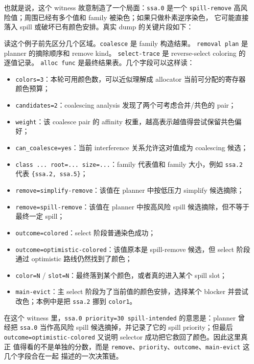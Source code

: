 \documentclass[UTF8,a4paper,11pt]{ctexart}
\begin{document}
也就是说，这个 witness 故意制造了一个局面：\texttt{ssa.0} 是一个
\texttt{spill-remove} 高风险值；周围已经有多个值和 family 被染色；如果只做朴素逆序染色，
它可能直接落入 spill 或破坏已有颜色安排。真实 dump 的关键片段如下：

读这个例子前先区分几个区域。\texttt{coalesce} 是 family 构造结果。
\texttt{removal plan} 是 planner 的摘除顺序和 remove kind。
\texttt{select-trace} 是 reverse-select coloring 的逐值记录。
\texttt{alloc func} 是最终结果表。几个字段可以这样读：

\begin{itemize}
  \item \texttt{colors=3}：本轮可用颜色数，可以近似理解成 allocator 当前可分配的寄存器颜色预算；
  \item \texttt{candidates=2}：coalescing analysis 发现了两个可考虑合并/共色的 pair；
  \item \texttt{weight}：该 coalesce pair 的 affinity 权重，越高表示越值得尝试保留共色偏好；
  \item \texttt{can\_coalesce=yes}：当前 interference 关系允许这对值成为 coalescing 候选；
  \item \texttt{class ... root=... size=...}：family 代表值和 family 大小，例如 \texttt{ssa.2} 代表 \texttt{\{ssa.2, ssa.5\}}；
  \item \texttt{remove=simplify-remove}：该值在 planner 中按低压力 simplify 候选摘除；
  \item \texttt{remove=spill-remove}：该值在 planner 中按高风险 spill 候选摘除，但不等于最终一定 spill；
  \item \texttt{outcome=colored}：select 阶段普通染色成功；
  \item \texttt{outcome=optimistic-colored}：该值原本是 spill-remove 候选，但 select 阶段通过 optimistic 路线仍然找到了颜色；
  \item \texttt{color=N} / \texttt{slot=N}：最终落到某个颜色，或者真的进入某个 spill slot；
  \item \texttt{main-evict}：主 select 阶段为了当前值的颜色安排，选择某个 blocker 并尝试改色；本例中是把 \texttt{ssa.2} 挪到 \texttt{color1}。
\end{itemize}

在这个 witness 里，\texttt{ssa.0 priority=30 spill-intended} 的意思是：planner 曾经把
\texttt{ssa.0} 当作高风险 spill 候选摘掉，并记录了它的 spill priority；但最后
\texttt{outcome=optimistic-colored} 又说明 selector 成功把它救回了颜色。因此这里真正
值得看的不是单独的分数，而是
\texttt{remove}、\texttt{priority}、\texttt{outcome}、\texttt{main-evict} 这几个字段合在一起
描述的一次决策链。
\end{document}
